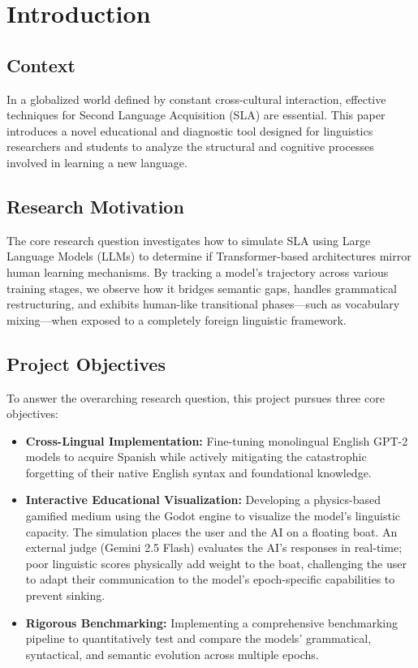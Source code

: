 \section{Introduction}
\label{sec:introduction}

\subsection*{Context}
In a globalized world defined by constant cross-cultural interaction, effective techniques for Second Language Acquisition (SLA) are essential. This paper introduces a novel educational and diagnostic tool designed for linguistics researchers and students to analyze the structural and cognitive processes involved in learning a new language.

\subsection*{Research Motivation}
The core research question investigates how to simulate SLA using Large Language Models (LLMs) to determine if Transformer-based architectures mirror human learning mechanisms. By tracking a model's trajectory across various training stages, we observe how it bridges semantic gaps, handles grammatical restructuring, and exhibits human-like transitional phases—such as vocabulary mixing—when exposed to a completely foreign linguistic framework.

\subsection*{Project Objectives}
To answer the overarching research question, this project pursues three core objectives:
\begin{itemize}
    \item \textbf{Cross-Lingual Implementation:} Fine-tuning monolingual English GPT-2 models to acquire Spanish while actively mitigating the catastrophic forgetting of their native English syntax and foundational knowledge.
    \item \textbf{Interactive Educational Visualization:} Developing a physics-based gamified medium using the Godot engine to visualize the model's linguistic capacity. The simulation places the user and the AI on a floating boat. An external judge (Gemini 2.5 Flash) evaluates the AI's responses in real-time; poor linguistic scores physically add weight to the boat, challenging the user to adapt their communication to the model's epoch-specific capabilities to prevent sinking.
    \item \textbf{Rigorous Benchmarking:} Implementing a comprehensive benchmarking pipeline to quantitatively test and compare the models' grammatical, syntactical, and semantic evolution across multiple epochs.
\end{itemize}
